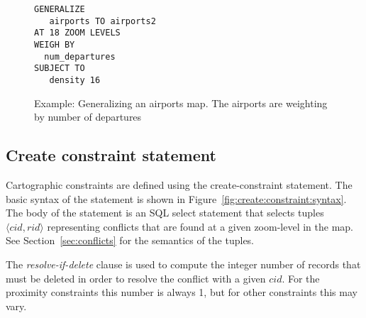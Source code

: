 
\begin{figure}[htbp]
\begin{center}
\begin{lstlisting}
GENERALIZE 
   airports TO airports2
AT 18 ZOOM LEVELS
WEIGH BY
  num_departures
SUBJECT TO 
   density 16 
\end{lstlisting}
\caption{Example: Generalizing an airports map. The airports are weighting by number of departures}
\label{fig:cvl:example:airports}
\end{center}
\end{figure}





\subsection{Create constraint statement}
\label{sec:create:constraint:statement}

Cartographic constraints are defined using the create-constraint statement.  The basic syntax of the statement is shown in Figure~\ref{fig:create:constraint:syntax}. The body of the statement is an SQL select statement that selects tuples $\langle cid, rid\rangle$ representing conflicts that are found at a given zoom-level in the map. See Section~\ref{sec:conflicts} for the semantics of the tuples.

The \emph{resolve-if-delete} clause is used to compute the integer number of records that must be deleted in order to resolve the conflict with a given $cid$. For the proximity constraints this number is always 1, but for other constraints this may vary.

